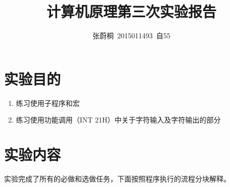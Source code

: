 \documentclass[UTF8,a4paper]{ctexart}
\title{计算机原理第三次实验报告}
\author{张蔚桐\ 2015011493\ 自55}
\begin{document}
\maketitle
\section{实验目的}
\begin{enumerate}
\item 练习使用子程序和宏
\item 练习使用功能调用（INT 21H）中关于字符输入及字符输出的部分
\end{enumerate}
\section{实验内容}
实验完成了所有的必做和选做任务，下面按照程序执行的流程分块解释。



\end{document}
